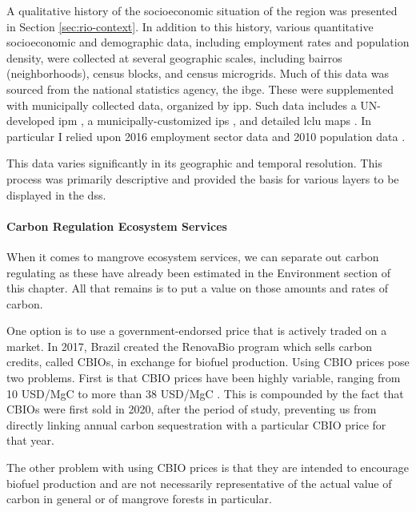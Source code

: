 A qualitative history of the socioeconomic situation of the region was presented in Section \ref{sec:rio-context}. In addition to this history, various quantitative socioeconomic and demographic data, including employment rates and population density, were collected at several geographic scales, including bairros (neighborhoods), census blocks, and census microgrids. Much of this data was sourced from the national statistics agency, the \ac{ibge}. These were supplemented with municipally collected data, organized by \ac{ipp}. Such data includes a UN-developed \ac{ipm} \cite{oxfordpovertyandhumandevelopmentinitiativeChartingPathewaysOut2020}, a municipally-customized \ac{ips} \cite{puliciRelatorioMetodologicoIndice2016}, and detailed \ac{lclu} maps \cite{regoAutomaticClassificationLand2003}. In particular I relied upon 2016 employment sector data \cite{institutopereirapassosNumeroEmpregadosPor2018} and 2010 population data \cite{institutopereirapassosPopulacaoResidentePor2018}.

This data varies significantly in its geographic and temporal resolution. This process was primarily descriptive and provided the basis for various layers to be displayed in the \ac{dss}.

\paragraph{Carbon Regulation Ecosystem Services} \leavevmode\newline

When it comes to mangrove ecosystem services, we can separate out carbon regulating as these have already been estimated in the Environment section of this chapter. All that remains is to put a value on those amounts and rates of carbon.

One option is to use a government-endorsed price that is actively traded on a market. In 2017, Brazil created the RenovaBio program which sells carbon credits, called CBIOs, in exchange for biofuel production. Using CBIO prices pose two problems. First is that CBIO prices have been highly variable, ranging from 10 USD/MgC \cite{castroBrazilianCarbonCredit2020} to more than 38 USD/MgC \cite{barrosBiofuelsAnnual2022}. This is compounded by the fact that CBIOs were first sold in 2020, after the period of study, preventing us from directly linking annual carbon sequestration with a particular CBIO price for that year.

The other problem with using CBIO prices is that they are intended to encourage biofuel production and are not necessarily representative of the actual value of carbon in general or of mangrove forests in particular.   

